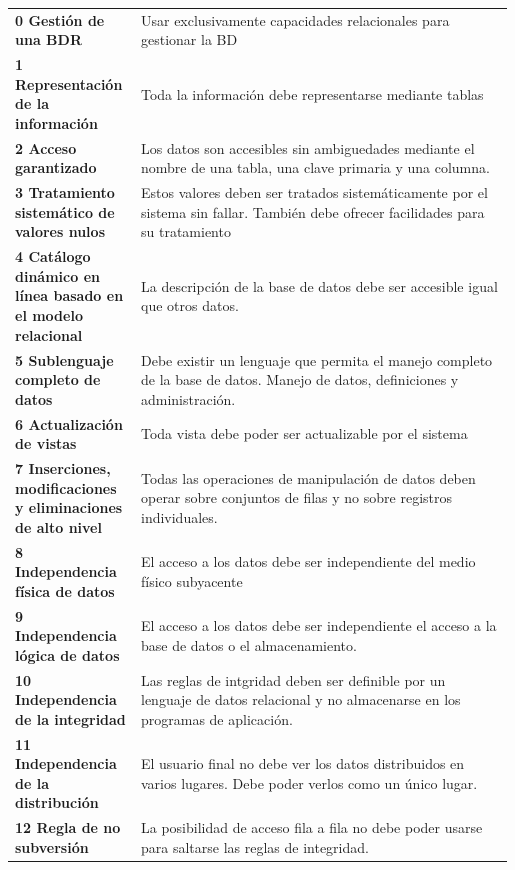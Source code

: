         \begin{table}[H]
        \begin{tabular}{>{\bf}p{0.25\linewidth}p{0.74\linewidth}}
            0 Gestión de una BDR & Usar exclusivamente capacidades relacionales para gestionar la BD \\
            1 Representación de la información & Toda la información debe representarse mediante tablas \\
            2 Acceso garantizado & Los datos son accesibles sin ambiguedades mediante el nombre de una tabla, una clave primaria y una columna. \\
            3 Tratamiento sistemático de valores nulos & Estos valores deben ser tratados sistemáticamente por el sistema sin fallar. También debe ofrecer facilidades para su tratamiento \\
            4 Catálogo dinámico en línea basado en el modelo relacional & La descripción de la base de datos debe ser accesible igual que otros datos.\\
            5 Sublenguaje completo de datos & Debe existir un lenguaje que permita el manejo completo de la base de datos. Manejo de datos, definiciones y administración. \\
            6 Actualización de vistas & Toda vista debe poder ser actualizable por el sistema \\
            7 Inserciones, modificaciones y eliminaciones de alto nivel & Todas las operaciones de manipulación de datos deben operar sobre conjuntos de filas y no sobre registros individuales. \\
            8 Independencia física de datos & El acceso a los datos debe ser independiente del medio físico subyacente \\
            9 Independencia lógica de datos & El acceso a los datos debe ser independiente el acceso a la base de datos o el almacenamiento. \\
            10 Independencia de la integridad & Las reglas de intgridad deben ser definible por un lenguaje de datos relacional y no almacenarse en los programas de aplicación. \\
            11 Independencia de la distribución & El usuario final no debe ver los datos distribuidos en varios lugares. Debe poder verlos como un único lugar. \\
            12 Regla de no subversión & La posibilidad de acceso fila a fila no debe poder usarse para saltarse las reglas de integridad. \\
        \end{tabular}
        \end{table}

